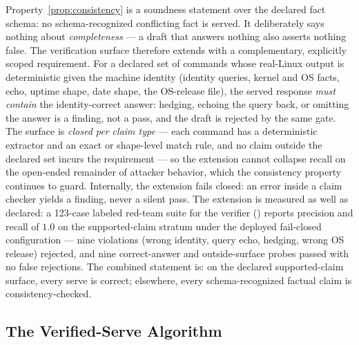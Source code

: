 Property~\ref{prop:consistency} is a soundness statement over the
declared fact schema: no schema-recognized conflicting fact is served.
It deliberately says nothing about \emph{completeness} --- a
draft that answers nothing also asserts nothing false. The verification
surface therefore extends with a complementary, explicitly scoped
requirement. For a declared set of commands whose real-Linux output is
deterministic given the machine identity (identity queries, kernel and
OS facts, echo, uptime shape, date shape, the OS-release file), the
served response \emph{must contain} the identity-correct answer:
hedging, echoing the query back, or omitting the answer is a finding,
not a pass, and the draft is rejected by the same gate. The surface is
\emph{closed per claim type} --- each command has a deterministic
extractor and an exact or shape-level match rule, and no claim outside
the declared set incurs the requirement --- so the extension cannot
collapse recall on the open-ended remainder of attacker behavior, which
the consistency property continues to guard. Internally, the extension
fails closed: an error inside a claim checker yields a finding, never a
silent pass. The extension is measured as well as declared: a
123-case labeled red-team suite for the verifier
() reports precision and
recall of $1.0$ on the supported-claim stratum under the deployed
fail-closed configuration --- nine violations (wrong identity, query
echo, hedging, wrong OS release) rejected, and nine correct-answer and
outside-surface probes passed with no false rejections. The combined
statement is: on the declared supported-claim surface, every serve is
correct; elsewhere, every schema-recognized factual claim is
consistency-checked.

\subsection{The Verified-Serve Algorithm}
\label{sec:algorithm}

